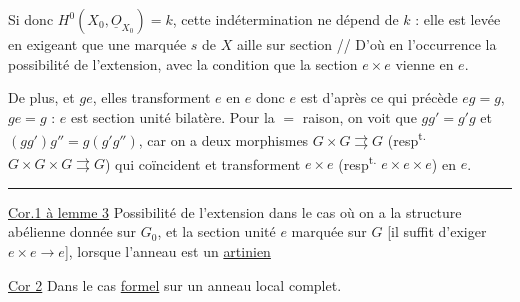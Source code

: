  Si donc $H^0(X_0,\underline O_{X_0})=k$, cette indétermination ne dépend  de $k$ : elle est levée en exigeant que une  marquée $s$ de $X$ aille sur  section   // D'où en l'occurrence la possibilité de  l'extension, avec la condition que la section $e\times e$ vienne en $e$.

De plus,  et $ge$, elles transforment $e$ en $e$ donc $e$ est  d'après ce qui précède $eg=g$, $ge=g$ : $e$ est section unité bilatère. Pour la $=$ raison, on voit que $gg'=g'g$ et $(gg')g''=g(g'g'')$, car on a deux morphismes $G\times G\rightrightarrows G$ (resp\textsuperscript{t.} $G\times G\times G\rightrightarrows G$) qui coïncident  et transforment $e\times e$ (resp\textsuperscript{t.} $e\times e\times e$) en $e$.

\noindent\rule{1.5cm}{0.3pt}

\uline{Cor.1 à lemme 3} Possibilité  de  l'extension dans le cas où on a la structure abélienne donnée sur $G_0$, et la section unité $e$ marquée sur $G$ [il suffit d'exiger $e\times e\longrightarrow e$], lorsque l'anneau est un  \uline{artinien}

\uline{Cor 2} Dans le cas \uline{formel} sur un anneau local complet.
